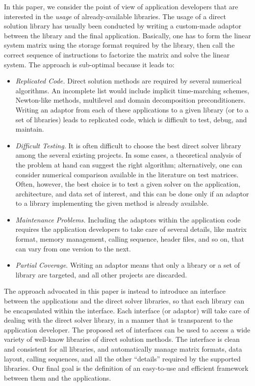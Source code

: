 \documentclass[acmtocl]{acmtrans2m}
\begin{document}
In this paper, we consider the point of view of application developers that
are interested in the {\sl usage} of already-available libraries.
The usage of a direct solution library has usually been conducted by writing a
custom-made adaptor between the library and the final application.
Basically, one
has to form the linear system matrix using the storage format required by the
library, then call the correct sequence of instructions to factorize the matrix
and solve the linear system.  The approach is sub-optimal because it leads to:
\begin{itemize}

\item 
{\sl Replicated Code.}
Direct solution methods are required by several numerical algorithms. An
incomplete list would include
implicit time-marching schemes, 
Newton-like methods, multilevel and domain decomposition preconditioners.
Writing an adaptor from each of these applications to a given library  
(or to a  set of libraries) leads to replicated code, which is difficult
to test, debug, and maintain.

\item 
{\sl Difficult Testing.}
It is often difficult to choose the best direct solver library among the
several existing projects.  In some cases, a theoretical analysis of
the problem at hand can suggest the right algorithm; alternatively, one can
consider numerical comparison available in the literature
on test matrices. Often, however, the best
choice is to test a given solver on the application, architecture, and data
set of interest, and this can be done only if an adaptor  to a library
implementing the given method is already available.

\item 
{\sl Maintenance Problems.}
Including the adaptors within the application code requires the application
developers to take care of several details, like matrix format, memory
management, calling sequence, header files, and so on, that can vary 
from one version to the next. 

\item {\sl Partial Coverage}. Writing an adaptor means that only a library or
a set of library are targeted, and all other projects are discarded. 
\end{itemize}

The approach advocated in this paper is instead to introduce an interface
between the applications and the direct solver libraries, so that each
library can be encapsulated within the interface. Each interface (or adaptor)
  will take care of dealing with the direct solver library, in a manner that
  is transparent to the application developer.  
The proposed set of interfaces
can be used to access a wide variety of
well-know libraries of direct solution methods. The interface is clean and
consistent for all libraries, and automatically manage matrix formats, data
layout, calling sequences, and all the other ``details'' required by the
supported libraries. Our final goal is the
definition of an easy-to-use and efficient framework between them and the
applications. 
\end{document}
